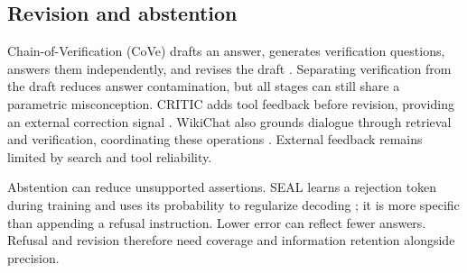 \subsection{Revision and abstention}

Chain-of-Verification (CoVe) drafts an answer, generates verification questions, answers them independently, and revises the draft \citep{dhuliawala-etal-2024-chain}. Separating verification from the draft reduces answer contamination, but all stages can still share a parametric misconception. CRITIC adds tool feedback before revision, providing an external correction signal \citep{extcritic2024}. WikiChat also grounds dialogue through retrieval and verification, coordinating these operations \citep{semnani-etal-2023-wikichat}. External feedback remains limited by search and tool reliability.

Abstention can reduce unsupported assertions. SEAL learns a rejection token during training and uses its probability to regularize decoding \citep{huang-etal-2025-alleviating}; it is more specific than appending a refusal instruction. Lower error can reflect fewer answers. Refusal and revision therefore need coverage and information retention alongside precision.
